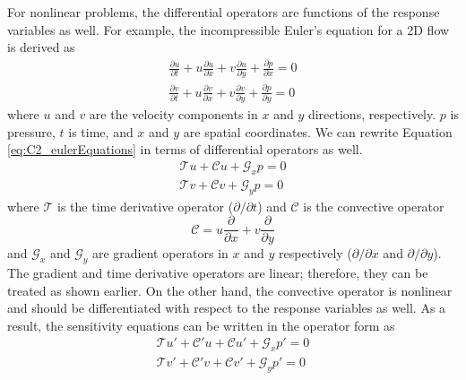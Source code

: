 For nonlinear problems, the differential operators are functions of the response variables as well. For example, the incompressible Euler's equation for a 2D flow is derived as
%
\begin{subequations}\label{eq:C2_eulerEquations}
\begin{gather}
    \frac{\partial u}{\partial t} +
    u \frac{\partial u}{\partial x} + v \frac{\partial u}{\partial y} +
    \frac{\partial p}{\partial x} = 0 
    \\
    \frac{\partial v}{\partial t} +
    u \frac{\partial v}{\partial x} + v \frac{\partial v}{\partial y} +
    \frac{\partial p}{\partial y} = 0
\end{gather}
\end{subequations}
%
where $u$ and $v$ are the velocity components in $x$ and $y$ directions, respectively. $p$ is pressure, $t$ is time, and $x$ and $y$ are spatial coordinates. We can rewrite Equation \eqref{eq:C2_eulerEquations} in terms of differential operators as well.
%
\begin{subequations}
\begin{gather*}
    \mathcal{T} u +
    \mathcal{C} u +
    \mathcal{G}_x p = 0 
    \\
    \mathcal{T} v +
    \mathcal{C} v +
    \mathcal{G}_y p = 0 
\end{gather*}
\end{subequations}
%
where $\mathcal{T}$ is the time derivative operator ($\partial /\partial t$) and $\mathcal{C}$ is the convective operator
%
\begin{equation}\label{eq:C2_convectiveOperator}
    \mathcal{C} = u \frac{\partial}{\partial x} + v \frac{\partial}{\partial y}
\end{equation}
%
and $\mathcal{G}_x$ and $\mathcal{G}_y$ are gradient operators in $x$ and $y$ respectively ($\partial /\partial x$ and $\partial /\partial y$). The gradient and time derivative operators are linear; therefore, they can be treated as shown earlier. On the other hand, the convective operator is nonlinear and should be differentiated with respect to the response variables as well. As a result, the sensitivity equations can be written in the operator form as
%
\begin{subequations}\label{eq:C2_eulerEquationsSA}
\begin{gather}
    \mathcal{T} u' +
    \mathcal{C}' u + \mathcal{C} u' +
    \mathcal{G}_x p' = 0 
    \\
    \mathcal{T} v' +
    \mathcal{C}' v + \mathcal{C} v' +
    \mathcal{G}_y p' = 0 
\end{gather}
\end{subequations}
